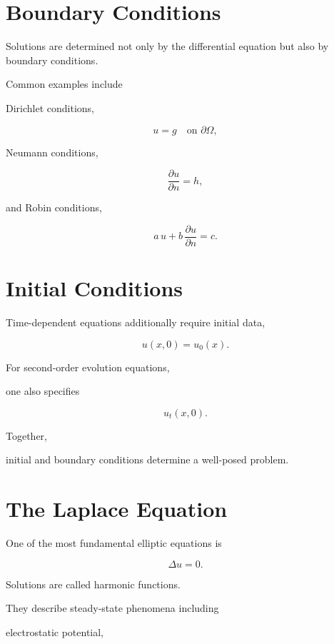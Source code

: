 \documentclass[11pt,fleqn]{book}
\numberwithin{equation}{chapter}
\theoremstyle{plain}
\theoremstyle{definition}
\theoremstyle{remark}
\begin{document}

\section{Boundary Conditions}

Solutions are determined not only by the differential equation but also
by boundary conditions.

Common examples include

Dirichlet conditions,

\[
\boxed{
u=g
\quad
\text{on }\partial\Omega,
}
\]

Neumann conditions,

\[
\boxed{
\frac{\partial u}{\partial n}
=h,
}
\]

and Robin conditions,

\[
\boxed{
a\,u
+
b\,
\frac{\partial u}{\partial n}
=
c.
}
\]


\section{Initial Conditions}

Time-dependent equations additionally require initial data,

\[
\boxed{
u(x,0)
=
u_0(x).
}
\]

For second-order evolution equations,

one also specifies

\[
u_t(x,0).
\]

Together,

initial and boundary conditions determine a well-posed problem.


\section{The Laplace Equation}

One of the most fundamental elliptic equations is

\[
\boxed{
\Delta u
=
0.
}
\]

Solutions are called harmonic functions.

They describe steady-state phenomena including

electrostatic potential,
\end{document}
